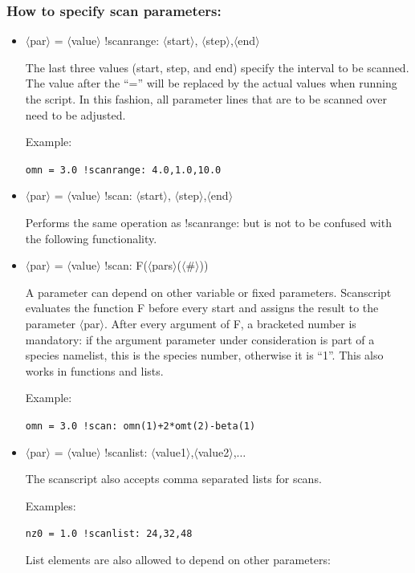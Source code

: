 \documentclass[12pt]{article}
\begin{document}
\subsubsection{How to specify scan parameters:} \label{sec:scandef}

\begin{itemize}
\item $\langle$par$\rangle$ = $\langle$value$\rangle$ !scanrange: $\langle$start$\rangle$,
$\langle$step$\rangle $,$\langle$end$\rangle$

The last three values (start, step, and end) specify the interval to be scanned. The value after
the ``='' will be replaced by the actual values when running the script. In this fashion,
all parameter lines that are to be scanned over need to be adjusted.

Example:

\texttt{omn = 3.0 !scanrange: 4.0,1.0,10.0}

\item $\langle$par$\rangle$ = $\langle$value$\rangle$ !scan: $\langle$start$\rangle$,
$\langle$step$\rangle $,$\langle$end$\rangle$

Performs the same operation as !scanrange: but is not to be confused
with the following functionality.

\item $\langle$par$\rangle$ = $\langle$value$\rangle$ !scan:
F($\langle$pars$\rangle$($\langle$\#$\rangle$))

A parameter can depend on other variable or fixed parameters.
Scanscript evaluates the function F before every \gene start and assigns
the result to the parameter $\langle$par$\rangle$.
After every argument of F, a bracketed number is mandatory: if the
argument parameter under consideration is part of a species namelist,
this is the
species number, otherwise it is ``1''.
This also works in functions and lists.

Example:

\texttt{omn = 3.0 !scan: omn(1)+2*omt(2)-beta(1)}

\item
$\langle$par$\rangle$ = $\langle$value$\rangle$ !scanlist: $\langle
$value1$\rangle$,$\langle$value2$\rangle$,$\ldots$

The scanscript also accepts comma separated lists for scans.

Examples:

\texttt{nz0 = 1.0 !scanlist: 24,32,48}

List elements are also allowed to depend on other parameters:


\end{itemize}
\end{document}
